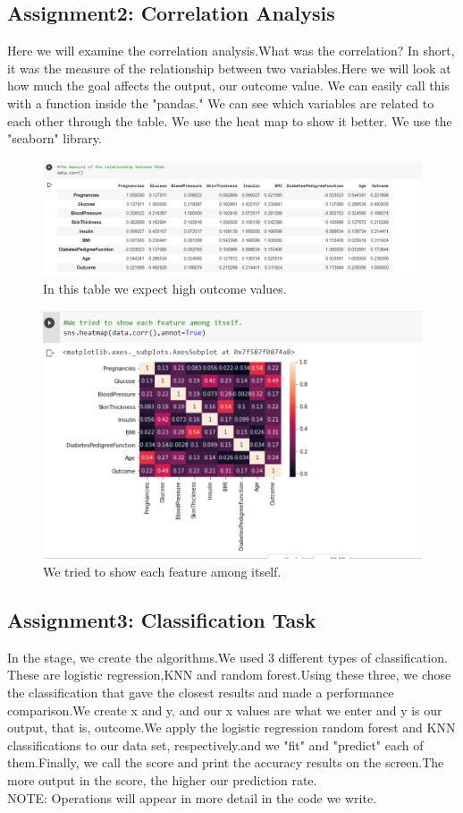 \documentclass[onecolumn]{article}
\begin{document}
\subsection{Assignment2: Correlation Analysis}
Here we will examine the correlation analysis.What was the correlation? In short, it was the measure of the relationship between two variables.Here we will look at how much the goal affects the output, our outcome value. We can easily call this with a function inside the "pandas." We can see which variables are related to each other through the table. We use the heat map to show it better.
We use the "seaborn" library.

\begin{figure}[hb]
\centering
   \includegraphics[scale=2,width=.9\linewidth]{corr.png}
\caption{\label{fig:code-2}
In this table we expect high outcome values.}
\end{figure}
\begin{figure}[hb]
\centering
   \includegraphics[scale=2,width=.9\linewidth]{heatmap.png}
\caption{\label{fig:code-2}
We tried to show each feature among itself.}
\end{figure}


\subsection{Assignment3: Classification Task }
In the stage, we create the algorithms.We used 3 different types of classification. These are logistic regression,KNN and random forest.Using these three, we chose the classification that gave the closest results and made a performance comparison.We create x and y, and our x values are what we enter and y is our output, that is, outcome.We apply the logistic regression random forest and KNN classifications to our data set, respectively.and we "fit" and "predict" each of them.Finally, we call the score and print the accuracy results on the screen.The more output in the score, the higher our prediction rate.
\\NOTE: Operations will appear in more detail in the code we write.
\end{document}

